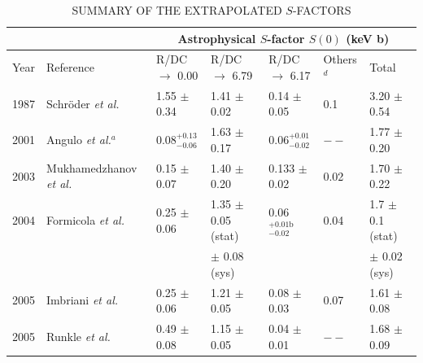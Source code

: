 \begin{table}
\caption{SUMMARY OF THE EXTRAPOLATED $S$-FACTORS}
\hspace*{-1.5cm}

\begin{threeparttable}
\begin{tabular}{@{}lllllll@{}}
\toprule
     &                                                          & \multicolumn{5}{c}{Astrophysical $S$-factor $S(0)$ (keV b)}                                                                                                                               \\ \midrule
Year & Reference                                                & R/DC $\rightarrow$ 0.00                         & R/DC $\rightarrow$ 6.79                 & R/DC $\rightarrow$ 6.17        & Others$^{d}$ & Total                                         \\
\hline
1987 & Schr{\"o}der \textit{et al.} \cite{Schroder1987}          & 1.55 $\pm$ 0.34                                 & 1.41 $\pm$ 0.02                         & 0.14 $\pm$ 0.05                & 0.1          & 3.20 $\pm$ 0.54                               \\
2001 & Angulo \textit{et al.}$^{a}$ \cite{Angulo2001}            & 0.08$^{+0.13}_{-0.06}$                          & 1.63 $\pm$ 0.17                         & 0.06$^{+0.01}_{-0.02}$          & $--$         & 1.77 $\pm$ 0.20                               \\
2003 & Mukhamedzhanov \textit{et al.} \cite{Mukhamedzhanov2003} & 0.15 $\pm$ 0.07                                 & 1.40 $\pm$ 0.20                         & 0.133 $\pm$ 0.02               & 0.02         & 1.70 $\pm$ 0.22                               \\
2004 & Formicola \textit{et al.} \cite{Formicola2004}            & 0.25 $\pm$ 0.06                                 & 1.35 $\pm$ 0.05 (stat) & 0.06$^{+0.01 \text{b}}_{-0.02}$ & 0.04         & 1.7 $\pm$ 0.1 (stat)        \\
 & & & $\pm$ 0.08 (sys) & & & $\pm$ 0.02 (sys) \\
2005 & Imbriani \textit{et al.} \cite{Imbriani2005}              & 0.25 $\pm$ 0.06                                 & 1.21 $\pm$ 0.05                         & 0.08 $\pm$ 0.03                & 0.07         & 1.61 $\pm$ 0.08                               \\
2005 & Runkle \textit{et al.} \cite{Runkle2005}                  & 0.49 $\pm$ 0.08                                 & 1.15 $\pm$ 0.05                         & 0.04 $\pm$ 0.01                & $--$         & 1.68 $\pm$ 0.09                               \\

\end{tabular}
\end{threeparttable}
\end{table}
